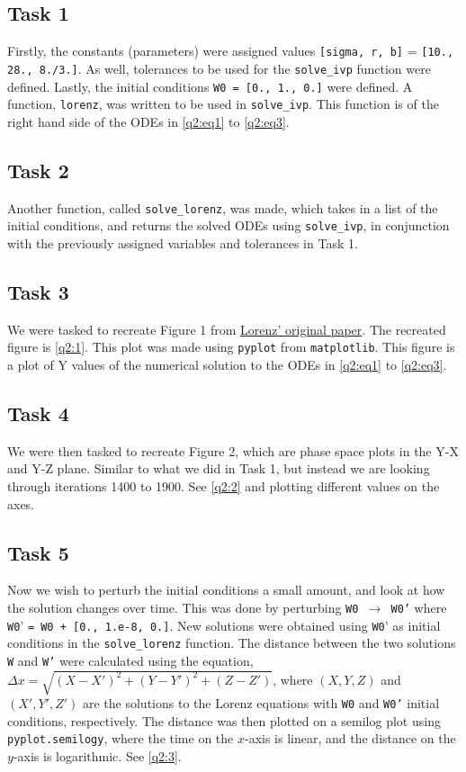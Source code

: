 \documentclass[a4paper,11pt]{article}
\theoremstyle{plain}
\theoremstyle{definition}
\theoremstyle{remark}
\begin{document}
\subsection*{Task 1}
Firstly, the constants (parameters) were assigned values
\texttt{[sigma, r, b]} = \texttt{[10., 28., 8./3.]}. 
As well, tolerances to be used for the \texttt{solve\_ivp}
function were defined. Lastly, the initial conditions
\texttt{W0 = [0., 1., 0.]} were defined. A function, \texttt{lorenz},
was written to be used
in \texttt{solve\_ivp}. This function is of
the right hand side of the ODEs in \cref{q2:eq1} to \cref{q2:eq3}.

\subsection*{Task 2}
Another function, called \texttt{solve\_lorenz}, was made,
which takes in a list of the initial conditions, and returns
the solved ODEs using \texttt{solve\_ivp}, in conjunction with
the previously assigned variables and tolerances in Task 1.

\subsection*{Task 3}
We were tasked to recreate Figure 1 from
\href{https://journals.ametsoc.org/view/journals/atsc/20/2/1520-0469_1963_020_0130_dnf_2_0_co_2.xml?tab_body=pdf}
{Lorenz' original paper}. The recreated figure is \cref{q2:1}. This
plot was made using \texttt{pyplot} from
\texttt{matplotlib}. This figure is a plot of Y values of the
numerical solution to the ODEs in \cref{q2:eq1} to \cref{q2:eq3}.



\subsection*{Task 4}
We were then tasked to recreate Figure 2, which are phase space
plots in the Y-X and Y-Z plane. Similar to what we did in Task 1,
but instead we are looking through iterations
1400 to 1900. See \cref{q2:2} and plotting different
values on the axes.

\subsection*{Task 5}
Now we wish to perturb the initial conditions
a small amount, and look at how the solution changes
over time. This was done by perturbing \texttt{W0 $\to$ W0'}
where \texttt{W0}' \texttt{= W0 + [0., 1.e-8, 0.]}. New solutions
were obtained using \texttt{W0}' as initial conditions
in the \texttt{solve\_lorenz} function. 
The distance between the two solutions \texttt{W} and \texttt{W'}
were calculated using the equation,
$\Delta x = \sqrt{(X-X')^2 + (Y-Y')^2 + (Z-Z')}$, where
$(X,Y,Z)$ and $(X', Y', Z')$ are the solutions to the Lorenz
equations with \texttt{W0} and \texttt{W0'} initial conditions,
respectively. The distance was then plotted
on a semilog plot using \texttt{pyplot.semilogy}, where
the time on the $x$-axis is linear, and the distance
on the $y$-axis is logarithmic. See \cref{q2:3}.
\end{document}

